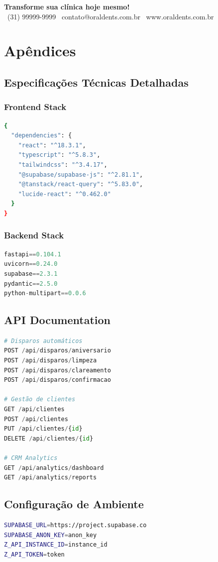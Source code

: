 \documentclass[11pt,a4paper]{article}
\newcommand{\sectiontitle}[1]{\section{\color{oraldentsblue}#1}}
\begin{document}
\begin{center}
\Large\textbf{\textcolor{oraldentsblue}{Transforme sua clínica hoje mesmo!}}\\
\normalsize
\faPhone\ (31) 99999-9999 \quad
\faEnvelope\ contato@oraldents.com.br \quad
\faGlobe\ www.oraldents.com.br
\end{center}

\newpage

\appendix

\sectiontitle{Apêndices}

\subsection{Especificações Técnicas Detalhadas}

\subsubsection{Frontend Stack}
\begin{lstlisting}[language=bash, caption=Package.json - Dependências Principais]
{
  "dependencies": {
    "react": "^18.3.1",
    "typescript": "^5.8.3",
    "tailwindcss": "^3.4.17",
    "@supabase/supabase-js": "^2.81.1",
    "@tanstack/react-query": "^5.83.0",
    "lucide-react": "^0.462.0"
  }
}
\end{lstlisting}

\subsubsection{Backend Stack}
\begin{lstlisting}[language=python, caption=Requirements.txt]
fastapi==0.104.1
uvicorn==0.24.0
supabase==2.3.1
pydantic==2.5.0
python-multipart==0.0.6
\end{lstlisting}

\subsection{API Documentation}
\begin{lstlisting}[language=python, caption=Endpoints Principais]
# Disparos automáticos
POST /api/disparos/aniversario
POST /api/disparos/limpeza
POST /api/disparos/clareamento
POST /api/disparos/confirmacao

# Gestão de clientes
GET /api/clientes
POST /api/clientes
PUT /api/clientes/{id}
DELETE /api/clientes/{id}

# CRM Analytics
GET /api/analytics/dashboard
GET /api/analytics/reports
\end{lstlisting}

\subsection{Configuração de Ambiente}
\begin{lstlisting}[language=bash, caption=.env Configuration]
SUPABASE_URL=https://project.supabase.co
SUPABASE_ANON_KEY=anon_key
Z_API_INSTANCE_ID=instance_id
Z_API_TOKEN=token
\end{lstlisting}
\end{document}

